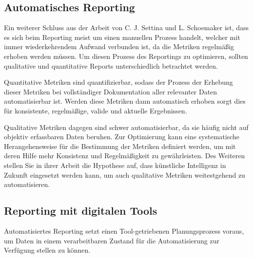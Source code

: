 
\subsection{Automatisches Reporting}
Ein weiterer Schluss aus der Arbeit von C. J. Settina und L. Schoemaker \cite{reportingInAgilePortfoliomanagement} ist, dass es sich beim Reporting meist um einen manuellen Prozess handelt, welcher mit immer wiederkehrendem Aufwand verbunden ist, da die Metriken regelmäßig erhoben werden müssen. Um diesen Prozess des Reportings zu optimieren, sollten qualitative und quantitative Reports unterschiedlich betrachtet werden.

Quantitative Metriken sind quantifizierbar, sodass der Prozess der Erhebung dieser Metriken bei vollständiger Dokumentation aller relevanter Daten automatisierbar ist. Werden diese Metriken dann automatisch erhoben sorgt dies für konsistente, regelmäßige, valide und aktuelle Ergebnissen.

Qualitative Metriken dagegen sind schwer automatisierbar, da sie häufig nicht auf objektiv erfassbaren Daten beruhen. Zur Optimierung kann eine systematische Herangehensweise für die Bestimmung der Metriken definiert werden, um mit deren Hilfe  mehr Konsistenz und Regelmäßigkeit zu gewährleisten. Des Weiteren stellen Sie in ihrer Arbeit die Hypothese auf, dass künstliche Intelligenz in Zukunft eingesetzt werden kann, um auch qualitative Metriken weitestgehend zu automatisieren.

\subsection{Reporting mit digitalen Tools}
Automatisiertes Reporting setzt einen Tool-getriebenen Planungsprozess voraus, um Daten in einem verarbeitbaren Zustand für die Automatisierung zur Verfügung stellen zu können.

